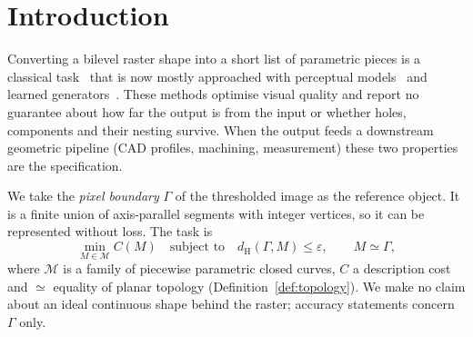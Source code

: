 \documentclass[11pt,a4paper]{article}
\theoremstyle{definition}
\theoremstyle{remark}
\newcommand{\dH}{d_{\mathrm{H}}}
\begin{document}
\section{Introduction}

Converting a bilevel raster shape into a short list of parametric pieces is a
classical task~\cite{selinger2003potrace,schneider1990fitting,kopf2011depixelizing}
that is now mostly approached with perceptual models~\cite{dominici2020} and
learned generators~\cite{rodriguez2025,gehlaut2026}.
These methods optimise visual quality and report no guarantee about how far
the output is from the input or whether holes, components and their nesting
survive. When the output feeds a downstream geometric pipeline (CAD profiles,
machining, measurement) these two properties are the specification.

We take the \emph{pixel boundary} $\Gamma$ of the thresholded image as the
reference object. It is a finite union of axis-parallel segments with integer
vertices, so it can be represented without loss. The task is
\begin{equation}\label{eq:problem}
  \min_{M\in\mathcal{M}} C(M)\quad\text{subject to}\quad
  \dH(\Gamma,M)\le\varepsilon,\qquad M\simeq\Gamma ,
\end{equation}
where $\mathcal{M}$ is a family of piecewise parametric closed curves, $C$ a
description cost and $\simeq$ equality of planar topology
(Definition~\ref{def:topology}). We make no claim about an ideal continuous
shape behind the raster; accuracy statements concern $\Gamma$ only.
\end{document}
